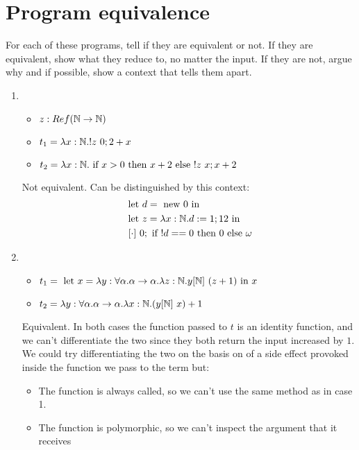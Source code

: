 \documentclass{article}
\begin{document}
\section{Program equivalence}
For each of these programs, tell if they are equivalent or not. If they are equivalent, show what they reduce to, no matter the input. If they are not, argue why and if possible, show a context that tells them apart.
\begin{enumerate}
    \item
        \begin{itemize}
            \item $z:Ref(\mathbb N\to\mathbb N)$
            \item $t_1=\lam{x:\N}{!z\ 0;2+x}$
            \item $t_2=\lam{x:\N}{\IF x>0 \THEN x+2 \ELSE !z\ x;x+2}$
        \end{itemize}
        Not equivalent. Can be distinguished by this context:
        \begin{align*}
            & \LET d = \NEW 0 \TIN\\
            & \LET z = \lam{x:\N}{d:=1;12} \TIN\\
            &\ [\cdot]\ 0; \IF !d == 0 \THEN 0 \ELSE \omega
        \end{align*}

    \item 
        \begin{itemize}
            \item $t_1= \LET x=\lam{y:\forall\alpha.\alpha\to\alpha}\lam{z:\N}{y[\N]\ (z+1)} \TIN x$
            \item $t_2= \lam{y:\forall\alpha.\alpha\to\alpha}\lam{x:\N}{(y[\N]\ x)+1}$
        \end{itemize}
        Equivalent. In both cases the function passed to $t$ is an identity function, and we can't differentiate the two since they both return the input increased by $1$. \\
        We could try differentiating the two on the basis on of a side effect provoked inside the function we pass to the term but:
        \begin{itemize}
            \item The function is always called, so we can't use the same method as in case 1.
            \item The function is polymorphic, so we can't inspect the argument that it receives
        \end{itemize}


\end{enumerate}
\end{document}
